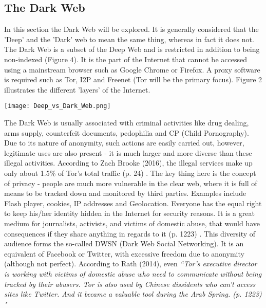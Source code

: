 \documentclass[a4paper, 12pt, titlepage]{article}
\begin{document}
\subsection{The Dark Web}
In this section the Dark Web will be explored. It is generally considered that the 'Deep' and the 'Dark' web to mean the same thing, whereas in fact it does not. The Dark Web is a subset of the Deep Web and is restricted in addition to being non-indexed (Figure 4). It is the part of the Internet that cannot be accessed using a mainstream browser such as Google Chrome or Firefox. A proxy software is required such as Tor, I2P and Freenet (Tor will be the primary focus). Figure 2 illustrates the different 'layers' of the Internet.

\begin{center}
\texttt{[image: Deep\_vs\_Dark\_Web.png]}
\label{fig:Dark}
\end{center}
The Dark Web is usually associated with criminal activities like drug dealing, arms supply, counterfeit documents, pedophilia and CP (Child Pornography). Due to its nature of anonymity, such actions are easily carried out, however, legitimate uses are also present - it is much larger and more diverse than these illegal activities. According to Zach Brooke (2016), the illegal services make up only about 1.5\% of Tor's total traffic (p. 24) \cite{MGtoDW}. The key thing here is the concept of privacy - people are much more vulnerable in the clear web, where it is full of means to be tracked down and monitored by third parties. Examples include Flash player, cookies, IP addresses and Geolocation. Everyone has the equal right to keep his/her identity hidden in the Internet for security reasons. It is a great medium for journalists, activists, and victims of domestic abuse, that would have consequences if they share anything in regards to it (p. 1223) \cite{PowerFreedom}. This diversity of audience forms the so-called DWSN (Dark Web Social Networking). It is an equivalent of Facebook or Twitter, with excessive freedom due to anonymity (although not perfect). According to Rath (2014), even \textit{``Tor's executive director is working with victims of domestic abuse who need to communicate without being tracked by their abusers. Tor is also used by Chinese dissidents who can't access sites like Twitter. And it became a valuable tool during the Arab Spring. (p. 1223) \cite{PowerFreedom}"} \\[6pt]
\end{document}
